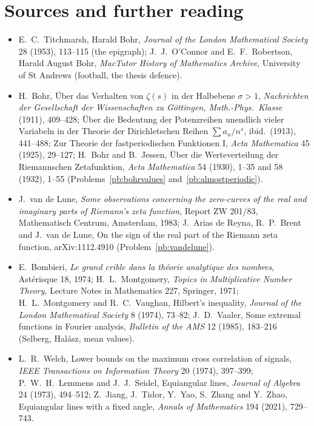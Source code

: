 \section*{Sources and further reading}

\begin{itemize}
\item E.~C.~Titchmarsh, Harald Bohr, \emph{Journal of the London Mathematical Society} 28 (1953), 113--115 (the epigraph); J.~J.~O'Connor and E.~F.~Robertson, Harald August Bohr,
\emph{MacTutor History of Mathematics Archive}, University of St Andrews (football, the thesis defence).
\item H.~Bohr, Über das Verhalten von $\zeta(s)$ in der Halbebene $\sigma>1$, \emph{Nachrichten der Gesellschaft der Wissenschaften zu Göttingen, Math.-Phys.\ Klasse} (1911), 409--428;
Über die Bedeutung der Potenzreihen unendlich vieler Variabeln in der Theorie der Dirichletschen Reihen $\sum a_n/n^s$, ibid.\ (1913), 441--488; Zur Theorie der fastperiodischen
Funktionen I, \emph{Acta Mathematica} 45 (1925), 29--127; H.~Bohr and B.~Jessen, Über die Werteverteilung der Riemannschen Zetafunktion, \emph{Acta Mathematica} 54 (1930), 1--35
and 58 (1932), 1--55 (Problems~\ref{pb:bohrvalues} and~\ref{pb:almostperiodic}).
\item J.~van de Lune, \emph{Some observations concerning the zero-curves of the real and imaginary parts of Riemann's zeta function}, Report ZW 201/83, Mathematisch Centrum,
Amsterdam, 1983; J.~Arias de Reyna, R.~P.~Brent and J.~van de Lune, On the sign of the real part of the Riemann zeta function, arXiv:1112.4910 (Problem~\ref{pb:vandelune}).
\item E.~Bombieri, \emph{Le grand crible dans la théorie analytique des nombres}, Astérisque 18, 1974; H.~L.~Montgomery, \emph{Topics in Multiplicative Number Theory}, Lecture
Notes in Mathematics 227, Springer, 1971; H.~L.~Montgomery and R.~C.~Vaughan, Hilbert's inequality, \emph{Journal of the London Mathematical Society} 8 (1974), 73--82; J.~D.~Vaaler,
Some extremal functions in Fourier analysis, \emph{Bulletin of the AMS} 12 (1985), 183--216 (Selberg, Halász, mean values).
\item L.~R.~Welch, Lower bounds on the maximum cross correlation of signals, \emph{IEEE Transactions on Information Theory} 20 (1974), 397--399; P.~W.~H.~Lemmens and J.~J.~Seidel,
Equiangular lines, \emph{Journal of Algebra} 24 (1973), 494--512; Z.~Jiang, J.~Tidor, Y.~Yao, S.~Zhang and Y.~Zhao, Equiangular lines with a fixed angle, \emph{Annals of Mathematics}
194 (2021), 729--743.

\end{itemize}
